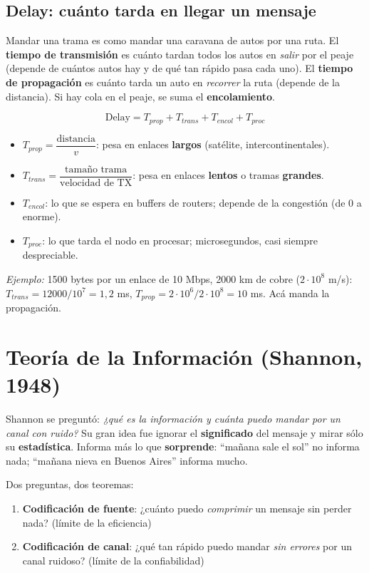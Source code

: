 \documentclass[10pt,a4paper]{article}
\begin{document}
\subsection{Delay: cuánto tarda en llegar un mensaje}
\begin{idea}
Mandar una trama es como mandar una caravana de autos por una ruta. El \textbf{tiempo de transmisión}
es cuánto tardan todos los autos en \emph{salir} por el peaje (depende de cuántos autos hay y de qué tan
rápido pasa cada uno). El \textbf{tiempo de propagación} es cuánto tarda un auto en \emph{recorrer} la ruta
(depende de la distancia). Si hay cola en el peaje, se suma el \textbf{encolamiento}.
\end{idea}
\[ \text{Delay} = T_{prop} + T_{trans} + T_{encol} + T_{proc} \]
\begin{itemize}
  \item $T_{prop} = \dfrac{\text{distancia}}{v}$: pesa en enlaces \textbf{largos} (satélite, intercontinentales).
  \item $T_{trans} = \dfrac{\text{tamaño trama}}{\text{velocidad de TX}}$: pesa en enlaces \textbf{lentos} o tramas \textbf{grandes}.
  \item $T_{encol}$: lo que se espera en buffers de routers; depende de la congestión (de 0 a enorme).
  \item $T_{proc}$: lo que tarda el nodo en procesar; microsegundos, casi siempre despreciable.
\end{itemize}
\textit{Ejemplo:} 1500 bytes por un enlace de 10 Mbps, 2000 km de cobre ($2\cdot10^8$ m/s):
$T_{trans} = 12000/10^7 = 1{,}2$ ms, $T_{prop} = 2\cdot10^6/2\cdot10^8 = 10$ ms. Acá manda la propagación.

\section{Teoría de la Información (Shannon, 1948)}

\begin{idea}
Shannon se preguntó: \emph{¿qué es la información y cuánta puedo mandar por un canal con ruido?}
Su gran idea fue ignorar el \textbf{significado} del mensaje y mirar sólo su \textbf{estadística}.
Informa más lo que \textbf{sorprende}: ``mañana sale el sol'' no informa nada; ``mañana nieva en Buenos Aires'' informa mucho.
\end{idea}

Dos preguntas, dos teoremas:
\begin{enumerate}
  \item \textbf{Codificación de fuente}: ¿cuánto puedo \emph{comprimir} un mensaje sin perder nada? (límite de la eficiencia)
  \item \textbf{Codificación de canal}: ¿qué tan rápido puedo mandar \emph{sin errores} por un canal ruidoso? (límite de la confiabilidad)
\end{enumerate}
\end{document}
